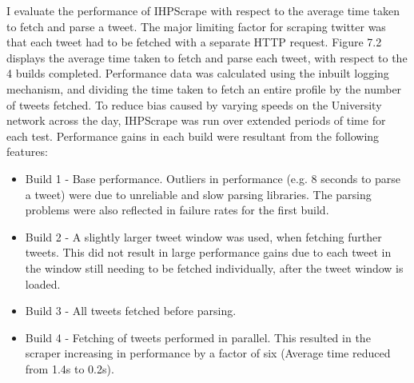
I evaluate the performance of IHPScrape with respect to the average time taken to fetch and parse a tweet. The major limiting factor for scraping twitter was that each tweet had to be fetched with a separate HTTP request. Figure 7.2 displays the average time taken to fetch and parse each tweet, with respect to the 4 builds completed. Performance data was calculated using the inbuilt logging mechanism, and dividing the time taken to fetch an entire profile by the number of tweets fetched. To reduce bias caused by varying speeds on the University network across the day, IHPScrape was run over extended periods of time for each test. Performance gains in each build were resultant from the following features:

\begin{itemize}
 \item Build 1 - Base performance. Outliers in performance (e.g. 8 seconds to parse a tweet) were due to unreliable and slow parsing libraries. The parsing problems were also reflected in failure rates for the first build.
 \item Build 2 - A slightly larger tweet window was used, when fetching further tweets. This did not result in large performance gains due to each tweet in the window still needing to be fetched individually, after the tweet window is loaded. 
 \item Build 3 - All tweets fetched before parsing. 
 \item Build 4 - Fetching of tweets performed in parallel. This resulted in the scraper increasing in performance by a factor of six (Average time reduced from 1.4s to 0.2s).
\end{itemize}

